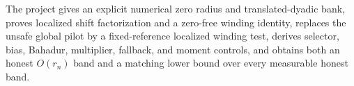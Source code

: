 The project gives an explicit numerical zero radius and translated-dyadic bank, proves localized shift factorization and a zero-free winding identity, replaces the unsafe global pilot by a fixed-reference localized winding test, derives selector, bias, Bahadur, multiplier, fallback, and moment controls, and obtains both an honest \(O(r_n)\) band and a matching lower bound over every measurable honest band.